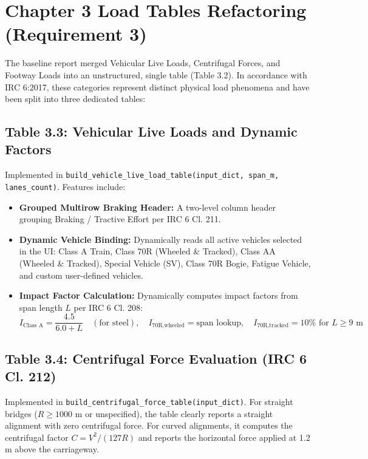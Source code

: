 \documentclass[12pt,a4paper]{article}
\begin{document}
\newpage

\section{Chapter 3 Load Tables Refactoring (Requirement 3)}

The baseline report merged Vehicular Live Loads, Centrifugal Forces, and Footway Loads into an unstructured, single table (Table 3.2). In accordance with IRC 6:2017, these categories represent distinct physical load phenomena and have been split into three dedicated tables:

\subsection{Table 3.3: Vehicular Live Loads and Dynamic Factors}
Implemented in \nolinkurl{build_vehicle_live_load_table(input_dict, span_m, lanes_count)}. Features include:
\begin{itemize}
  \item \textbf{Grouped Multirow Braking Header:} A two-level column header grouping Braking / Tractive Effort per IRC 6 Cl. 211.
  \item \textbf{Dynamic Vehicle Binding:} Dynamically reads all active vehicles selected in the UI: Class A Train, Class 70R (Wheeled \& Tracked), Class AA (Wheeled \& Tracked), Special Vehicle (SV), Class 70R Bogie, Fatigue Vehicle, and custom user-defined vehicles.
  \item \textbf{Impact Factor Calculation:} Dynamically computes impact factors from span length $L$ per IRC 6 Cl. 208:
    \begin{equation}
      I_{\text{Class A}} = \frac{4.5}{6.0 + L} \quad (\text{for steel}), \quad I_{\text{70R,wheeled}} = \text{span lookup}, \quad I_{\text{70R,tracked}} = 10\% \text{ for } L \geq 9\text{ m}
    \end{equation}
\end{itemize}

\subsection{Table 3.4: Centrifugal Force Evaluation (IRC 6 Cl. 212)}
Implemented in \nolinkurl{build_centrifugal_force_table(input_dict)}. For straight bridges ($R \geq 1000\text{ m}$ or unspecified), the table clearly reports a straight alignment with zero centrifugal force. For curved alignments, it computes the centrifugal factor $C = V^2 / (127 R)$ and reports the horizontal force applied at 1.2 m above the carriageway.
\end{document}
